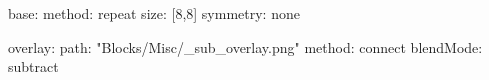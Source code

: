 base:
  method: repeat
  size: [8,8]
  symmetry: none

overlay:
  path: "Blocks/Misc/_sub_overlay.png"
  method: connect
blendMode: subtract